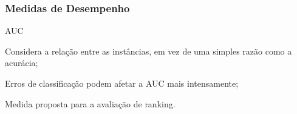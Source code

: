 \begin{frame}
    \frametitle{Medidas de Desempenho}


    \begin{block}{AUC}
        \item Considera a relação entre as instâncias, em vez de uma simples razão como a acurácia;
        \item Erros de classificação podem afetar a AUC mais intensamente;
        \item Medida proposta para a avaliação de ranking.
    \end{block}
\end{frame}